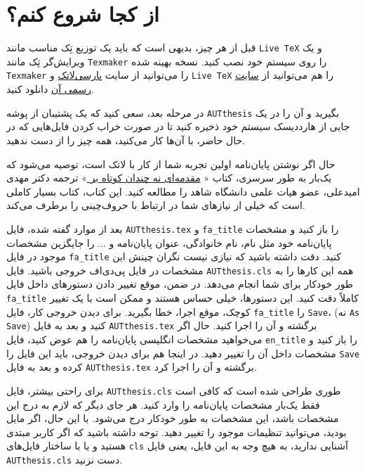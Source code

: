 \section{از کجا شروع کنم؟}
قبل از هر چیز، بدیهی است که باید یک توزیع تِک مناسب مانند 
\verb;Live TeX;
و یک ویرایش‌گر تِک مانند
\verb;Texmaker;
را روی سیستم خود نصب کنید.  نسخه بهینه شده 
\verb;Texmaker;
را می‌توانید  از سایت 
 \href{http://www.parsilatex.com}{پارسی‌لاتک}%
 و
\verb;Live TeX;
را هم می‌توانید از 
 \href{http://www.tug.org/texlive}{سایت رسمی آن}%
 دانلود کنید.
 
در مرحله بعد، سعی کنید که  یک پشتیبان از پوشه 
\verb;AUTthesis;
 بگیرید و آن را در یک جایی از هارددیسک سیستم خود ذخیره کنید تا در صورت خراب کردن فایل‌هایی که در حال حاضر، با آن‌ها کار می‌کنید، همه چیز را از 
 دست ندهید.
 
 حال اگر نوشتن پایان‌نامه اولین تجربه شما از کار با لاتک است، توصیه می‌شود که یک‌بار به طور سرسری، کتاب «%
\href{http://www.tug.ctan.org/tex-archive/info/lshort/persian/lshort.pdf}{مقدمه‌ای نه چندان کوتاه بر
\lr{\LaTeXe}}»
   ترجمه دکتر مهدی امیدعلی، عضو هیات علمی دانشگاه شاهد را مطالعه کنید. این کتاب، کتاب بسیار کاملی است که خیلی از نیازهای شما در ارتباط با حروف‌چینی را برطرف می‌کند.
 
 
بعد از موارد گفته شده، فایل 
\verb;AUTthesis.tex;
و
\verb;fa_title;
را باز کنید و مشخصات پایان‌نامه خود مثل نام، نام خانوادگی، عنوان پایان‌نامه و ... را جایگزین مشخصات موجود در فایل
\verb;fa_title;
 کنید. دقت داشته باشید که نیازی نیست 
نگران چینش این مشخصات در فایل پی‌دی‌اف خروجی باشید. فایل 
\verb;AUTthesis.cls;
همه این کارها را به طور خودکار برای شما انجام می‌دهد. در ضمن، موقع تغییر دادن دستورهای داخل فایل
\verb;fa_title;
 کاملاً دقت کنید. این دستورها، خیلی حساس هستند و ممکن است با یک تغییر کوچک، موقع اجرا، خطا بگیرید. برای دیدن خروجی کار، فایل 
\verb;fa_title;
 را 
\verb;Save;، 
(نه 
\verb;As Save;)
کنید و بعد به فایل 
\verb;AUTthesis.tex;
برگشته و آن را اجرا کنید. حال اگر می‌خواهید مشخصات انگلیسی پایان‌نامه را هم عوض کنید، فایل 
\verb;en_title;
را باز کنید و مشخصات داخل آن را تغییر دهید.%
 در اینجا هم برای دیدن خروجی، باید این فایل را 
\verb;Save;
کرده و بعد به فایل 
\verb;AUTthesis.tex;
برگشته و آن را اجرا کرد.

برای راحتی بیشتر، 
فایل 
\verb;AUTthesis.cls;
طوری طراحی شده است که کافی است فقط  یک‌بار مشخصات پایان‌نامه  را وارد کنید. هر جای دیگر که لازم به درج این مشخصات باشد، این مشخصات به طور خودکار درج می‌شود. با این حال، اگر مایل بودید، می‌توانید تنظیمات موجود را تغییر دهید. توجه داشته باشید که اگر کاربر مبتدی هستید و یا با ساختار فایل‌های  
\verb;cls;
 آشنایی ندارید، به هیچ وجه به این فایل، یعنی فایل 
\verb;AUTthesis.cls;
دست نزنید.

